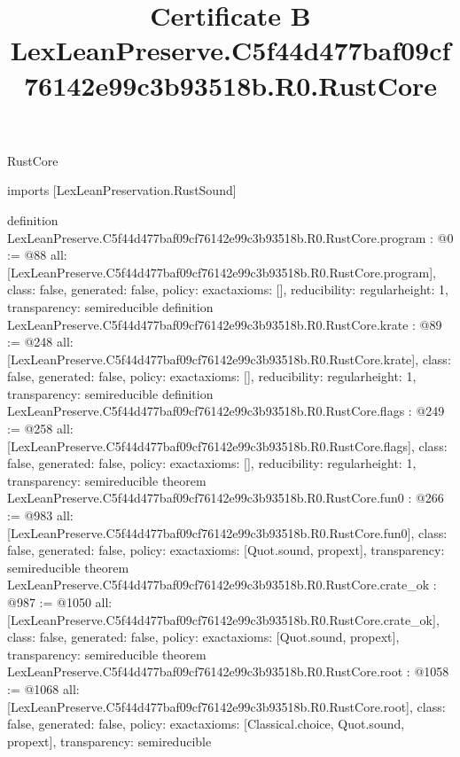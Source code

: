 \begin{lexlean}{RustCore}
\title{Certificate B LexLeanPreserve.C5f44d477baf09cf76142e99c3b93518b.R0.RustCore}
\begin{coremodule}
imports [LexLeanPreservation.RustSound]

definition LexLeanPreserve.C5f44d477baf09cf76142e99c3b93518b.R0.RustCore.program : @0 := @88 {
  all: [LexLeanPreserve.C5f44d477baf09cf76142e99c3b93518b.R0.RustCore.program],
  class: false,
  generated: false,
  policy: exact{axioms: []},
  reducibility: regular{height: 1},
  transparency: semireducible
}
definition LexLeanPreserve.C5f44d477baf09cf76142e99c3b93518b.R0.RustCore.krate : @89 := @248 {
  all: [LexLeanPreserve.C5f44d477baf09cf76142e99c3b93518b.R0.RustCore.krate],
  class: false,
  generated: false,
  policy: exact{axioms: []},
  reducibility: regular{height: 1},
  transparency: semireducible
}
definition LexLeanPreserve.C5f44d477baf09cf76142e99c3b93518b.R0.RustCore.flags : @249 := @258 {
  all: [LexLeanPreserve.C5f44d477baf09cf76142e99c3b93518b.R0.RustCore.flags],
  class: false,
  generated: false,
  policy: exact{axioms: []},
  reducibility: regular{height: 1},
  transparency: semireducible
}
theorem LexLeanPreserve.C5f44d477baf09cf76142e99c3b93518b.R0.RustCore.fun0 : @266 := @983 {
  all: [LexLeanPreserve.C5f44d477baf09cf76142e99c3b93518b.R0.RustCore.fun0],
  class: false,
  generated: false,
  policy: exact{axioms: [Quot.sound, propext]},
  transparency: semireducible
}
theorem LexLeanPreserve.C5f44d477baf09cf76142e99c3b93518b.R0.RustCore.crate_ok : @987 := @1050 {
  all: [LexLeanPreserve.C5f44d477baf09cf76142e99c3b93518b.R0.RustCore.crate_ok],
  class: false,
  generated: false,
  policy: exact{axioms: [Quot.sound, propext]},
  transparency: semireducible
}
theorem LexLeanPreserve.C5f44d477baf09cf76142e99c3b93518b.R0.RustCore.root : @1058 := @1068 {
  all: [LexLeanPreserve.C5f44d477baf09cf76142e99c3b93518b.R0.RustCore.root],
  class: false,
  generated: false,
  policy: exact{axioms: [Classical.choice, Quot.sound, propext]},
  transparency: semireducible
}


\end{coremodule}
\end{lexlean}
